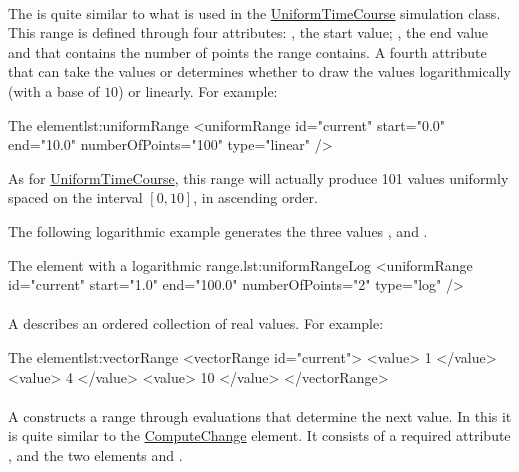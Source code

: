 \paragraph{}
\label{class:uniformRange}
The  is quite similar to what is used in the \hyperref[class:uniformTimeCourse]{UniformTimeCourse} simulation class. This range is defined through four attributes: , the start value; , the end value and  that contains the number of points the range contains. A fourth attribute  that can take the values  or  determines whether to draw the values logarithmically (with a base of $10$) or linearly.  For example:
\begin{myXmlLst}{The  element}{lst:uniformRange}
    <uniformRange id="current" start="0.0" end="10.0" numberOfPoints="100" type="linear" /> 
\end{myXmlLst}
As for \hyperref[class:uniformTimeCourse]{UniformTimeCourse}, this range will actually produce 101 values uniformly spaced on the interval $[0, 10]$, in ascending order.

The following logarithmic example generates the three values ,  and .
\begin{myXmlList}{The  element with a logarithmic range.}{lst:uniformRangeLog}
    <uniformRange id="current" start="1.0" end="100.0" numberOfPoints="2" type="log" />
\end{myXmlList}

\paragraph{}
\label{class:vectorRange}
A  describes an ordered collection of real values. For example:
\begin{myXmlLst}{The  element}{lst:vectorRange}
    <vectorRange id="current"> 
        <value> 1 </value> 
        <value> 4 </value> 
        <value> 10 </value> 
    </vectorRange> 
\end{myXmlLst}

\paragraph{}
\label{class:functionalRange}
A  constructs a range through evaluations that determine the next value. In this it is quite similar to the \hyperref[class:computeChange]{ComputeChange} element. It consists of a required attribute , and the two elements  and .

